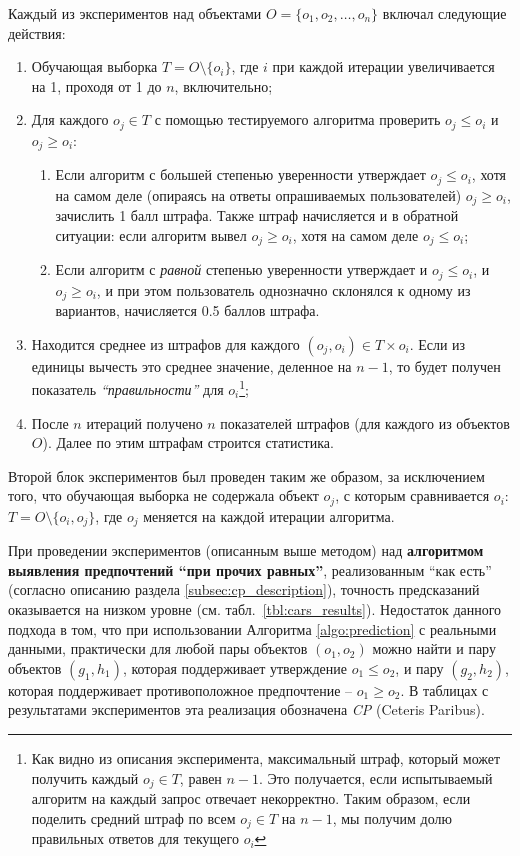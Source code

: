 	Каждый из экспериментов над объектами $O = \{o_1, o_2, \dots, o_n\}$ включал следующие действия:
	\begin{enumerate}
		\item Обучающая выборка $T = O \setminus \{o_i\}$, где $i$ при каждой итерации увеличивается на 1, проходя от 1 до $n$, включительно;
		\item Для каждого $o_j \in T$ с помощью тестируемого алгоритма проверить $o_j \leq o_i$ и $o_j \geq o_i$:
		\begin{enumerate}
			\item Если алгоритм с большей степенью уверенности утверждает $o_j \leq o_i$, хотя на самом деле (опираясь на ответы опрашиваемых пользователей) $o_j \geq o_i$, зачислить 1 балл штрафа. Также штраф начисляется и в обратной ситуации: если алгоритм вывел $o_j \geq o_i$, хотя на самом деле $o_j \leq o_i$;
			\item Если алгоритм с \emph{равной} степенью уверенности утверждает и $o_j \leq o_i$, и $o_j \geq o_i$, и при этом пользователь однозначно склонялся к одному из вариантов, начисляется 0.5 баллов штрафа.
		\end{enumerate} 
		\item Находится среднее из штрафов для каждого $(o_j, o_i) \in T \times o_i$. Если из единицы вычесть это среднее значение, деленное на $n-1$, то будет получен показатель \emph{``правильности''} для $o_i$\footnote{Как видно из описания эксперимента, максимальный штраф, который может получить каждый $o_j \in T$, равен $n-1$. Это получается, если испытываемый алгоритм на каждый запрос отвечает некорректно. Таким образом, если поделить средний штраф по всем $o_j \in T$ на $n-1$, мы получим долю правильных ответов для текущего $o_i$};
		\item После $n$ итераций получено $n$ показателей штрафов (для каждого из объектов $O$). Далее по этим штрафам строится статистика.
	\end{enumerate}
	Второй блок экспериментов был проведен таким же образом, за исключением того, что обучающая выборка не содержала объект $o_j$, с которым сравнивается $o_i$: $T = O \setminus \{o_i, o_j\}$, где $o_j$ меняется на каждой итерации алгоритма.
		
	При проведении экспериментов (описанным выше методом) над \textbf{алгоритмом выявления предпочтений \enquote{при прочих равных}}, реализованным ``как есть'' (согласно описанию раздела \ref{subsec:cp_description}), точность предсказаний оказывается на низком уровне (см. табл.~\ref{tbl:cars_results}).
	Недостаток данного подхода в том, что при использовании Алгоритма \ref{algo:prediction} с реальными данными, практически для любой пары объектов $(o_1,o_2)$ можно найти и пару объектов $(g_1,h_1)$, которая поддерживает утверждение $o_1 \leq o_2$, и пару $(g_2,h_2)$, которая поддерживает противоположное предпочтение – $o_1 \geq o_2$. В таблицах с результатами экспериментов эта реализация обозначена \emph{CP} (Ceteris Paribus). 
	
